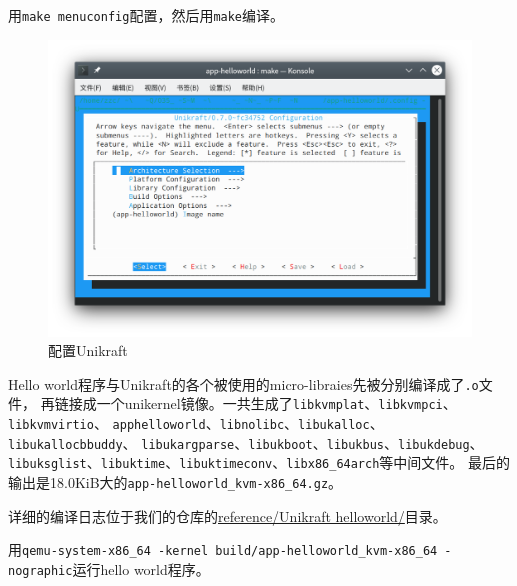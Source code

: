 \documentclass{../runikraft-report}
\begin{document}
用\texttt{make menuconfig}配置，然后用\texttt{make}编译。
\begin{figure}[!hbt]
\centering
\vspace*{-3ex}
\includegraphics[width=0.9\linewidth]{assets/unikraft-menuconfig}
\vspace*{-3ex}
\caption{配置Unikraft}
\label{fig:unikraft-menuconfig}
\end{figure}
Hello world程序与Unikraft的各个被使用的micro-libraies先被分别编译成了\texttt{.o}文件，
再链接成一个unikernel镜像。一共生成了\texttt{libkvmplat}、\texttt{libkvmpci}、\texttt{libkvmvirtio}、
\texttt{apphelloworld}、\texttt{libnolibc}、\texttt{libukalloc}、\texttt{libukallocbbuddy}、
\texttt{libukargparse}、\texttt{libukboot}、\texttt{libukbus}、\texttt{libukdebug}、
\texttt{libuksglist}、\texttt{libuktime}、\texttt{libuktimeconv}、\texttt{libx86\_64arch}等中间文件。
最后的输出是18.0KiB大的\texttt{app-\linebreak helloworld\_kvm-x86\_64.gz}。

详细的编译日志位于我们的仓库的\href{https://github.com/OSH-2022/x-runikraft/tree/d22ccf0c1b248667148fd8953b71b6e0258de6a3/reference/Unikraft%20helloworld}{reference/Unikraft helloworld/}目录。

用\texttt{qemu-system-x86\_64 -kernel build/app-helloworld\_kvm-x86\_64 -nographic}\linebreak 运行hello world程序。
\end{document}
